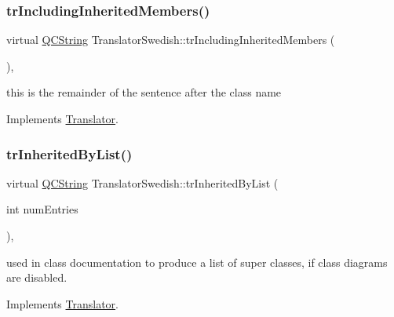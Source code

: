 \mbox{\label{class_translator_swedish_a91179ef7fd51430fff6b1642cc632938}} 
\subsubsection{\texorpdfstring{trIncludingInheritedMembers()}{trIncludingInheritedMembers()}}
{\footnotesize\ttfamily virtual \mbox{\hyperlink{class_q_c_string}{Q\+C\+String}} Translator\+Swedish\+::tr\+Including\+Inherited\+Members (\begin{DoxyParamCaption}{ }\end{DoxyParamCaption})\hspace{0.3cm}{\ttfamily [inline]}, {\ttfamily [virtual]}}

this is the remainder of the sentence after the class name 

Implements \mbox{\hyperlink{class_translator}{Translator}}.

\mbox{\label{class_translator_swedish_abc7c6699afd803f73d368a6107caef36}} 
\subsubsection{\texorpdfstring{trInheritedByList()}{trInheritedByList()}}
{\footnotesize\ttfamily virtual \mbox{\hyperlink{class_q_c_string}{Q\+C\+String}} Translator\+Swedish\+::tr\+Inherited\+By\+List (\begin{DoxyParamCaption}\item[{int}]{num\+Entries }\end{DoxyParamCaption})\hspace{0.3cm}{\ttfamily [inline]}, {\ttfamily [virtual]}}

used in class documentation to produce a list of super classes, if class diagrams are disabled. 

Implements \mbox{\hyperlink{class_translator}{Translator}}.

\mbox{\label{class_translator_swedish_a12ae84d26aca2f9324bf6628ed129fbb}} 
